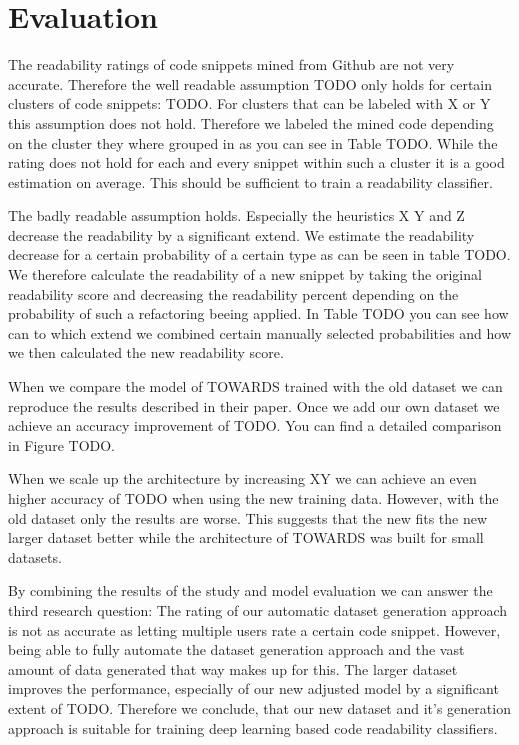 \documentclass[%
class=scrreprt,
chapterprefix=false,%
open=right,%
twoside=false,%
paper=a4,%
logofile={Logo\_zentral\_farbig\_EN.png},%
thesistype=master,%
UKenglish,%
]{se2thesis}
\begin{document}
\section{Evaluation} \label{Evaluation}
	The readability ratings of code snippets mined from Github are not very accurate. Therefore the well readable assumption TODO only holds for certain clusters of code snippets: TODO. For clusters that can be labeled with X or Y this assumption does not hold. Therefore we labeled the mined code depending on the cluster they where grouped in as you can see in Table TODO. While the rating does not hold for each and every snippet within such a cluster it is a good estimation on average. This should be sufficient to train a readability classifier.
	
	The badly readable assumption holds. Especially the heuristics X Y and Z decrease the readability by a significant extend. We estimate the readability decrease for a certain probability of a certain type as can be seen in table TODO. We therefore calculate the readability of a new snippet by taking the original readability score and decreasing the readability percent depending on the probability of such a refactoring beeing applied.	In Table TODO you can see how can to which extend we combined certain manually selected probabilities and how we then calculated the new readability score.
	
	When we compare the model of TOWARDS trained with the old dataset we can reproduce the results described in their paper. Once we add our own dataset we achieve an accuracy improvement of TODO. You can find a detailed comparison in Figure TODO.
	
	When we scale up the architecture by increasing XY we can achieve an even higher accuracy of TODO when using the new training data. However, with the old dataset only the results are worse. This suggests that the new fits the new larger dataset better while the architecture of TOWARDS was built for small datasets.
	
	By combining the results of the study and model evaluation we can answer the third research question: The rating of our automatic dataset generation approach is not as accurate as letting multiple users rate a certain code snippet. However, being able to fully automate the dataset generation approach and the vast amount of data generated that way makes up for this. The larger dataset improves the performance, especially of our new adjusted model by a significant extent of TODO. Therefore we conclude, that our new dataset and it's generation approach is suitable for training deep learning based code readability classifiers.
	
\end{document}

